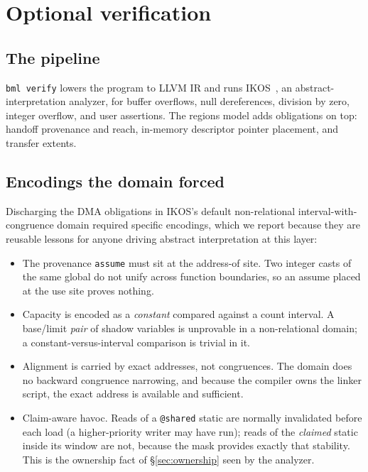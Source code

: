 \documentclass[10pt,twocolumn]{article}
\begin{document}
\section{Optional verification}
\label{sec:verify}

\subsection{The pipeline}

\texttt{bml verify} lowers the program to LLVM IR and runs
IKOS~\cite{ikos}, an abstract-interpretation analyzer, for buffer overflows,
null dereferences, division by zero, integer overflow, and user assertions. The
regions model adds obligations on top: handoff provenance and reach, in-memory
descriptor pointer placement, and transfer extents.

\subsection{Encodings the domain forced}

Discharging the DMA obligations in IKOS's default non-relational
interval-with-congruence domain required specific encodings, which we report
because they are reusable lessons for anyone driving abstract interpretation at
this layer:

\begin{itemize}
\item The provenance \texttt{assume} must sit at the address-of site. Two integer
casts of the same global do not unify across function boundaries, so an assume
placed at the use site proves nothing.
\item Capacity is encoded as a \emph{constant} compared against a count interval.
A base/limit \emph{pair} of shadow variables is unprovable in a non-relational
domain; a constant-versus-interval comparison is trivial in it.
\item Alignment is carried by exact addresses, not congruences. The domain does
no backward congruence narrowing, and because the compiler owns the linker
script, the exact address is available and sufficient.
\item Claim-aware havoc. Reads of a \texttt{@shared} static are normally
invalidated before each load (a higher-priority writer may have run); reads of
the \emph{claimed} static inside its window are not, because the mask provides
exactly that stability. This is the ownership fact of \S\ref{sec:ownership} seen
by the analyzer.
\end{itemize}
\end{document}
